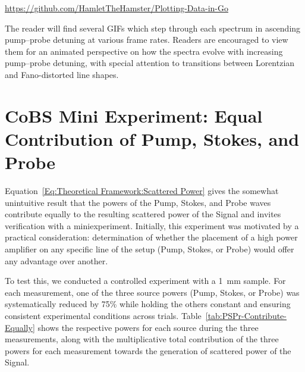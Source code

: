 \hfill

\begin{center}
  \url{https://github.com/HamletTheHamster/Plotting-Data-in-Go}
\end{center}

\hfill

The reader will find several GIFs which step through each spectrum in ascending pump--probe detuning at various frame rates. Readers are encouraged to view them for an animated perspective on how the spectra evolve with increasing pump--probe detuning, with special attention to transitions between Lorentzian and Fano-distorted line shapes.

\newpage


\section{CoBS Mini Experiment: Equal Contribution of Pump, Stokes, and Probe}

Equation~\ref{Eq:Theoretical Framework:Scattered Power} gives the somewhat unintuitive result that the powers of the Pump, Stokes, and Probe waves contribute equally to the resulting scattered power of the Signal and invites verification with a miniexperiment. Initially, this experiment was motivated by a practical consideration: determination of whether the placement of a high power amplifier on any specific line of the setup (Pump, Stokes, or Probe) would offer any advantage over another.

To test this, we conducted a controlled experiment with a \SI{1}{\milli\meter}  sample. For each measurement, one of the three source powers (Pump, Stokes, or Probe) was systematically reduced by 75\% while holding the others constant and ensuring consistent experimental conditions across trials. Table~\ref{tab:PSPr-Contribute-Equally} shows the respective powers for each source during the three measurements, along with the multiplicative total contribution of the three powers for each measurement towards the generation of scattered power of the Signal.

